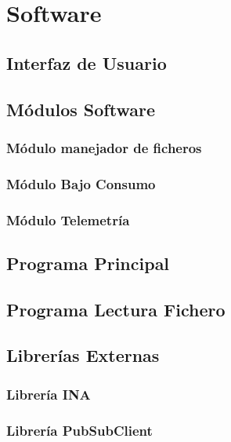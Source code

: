 \section{Software}

\subsection{Interfaz de Usuario}


\subsection{Módulos Software}
\subsubsection{Módulo manejador de ficheros}\label{subsubsec:ManejadorFicheros}








\subsubsection{Módulo Bajo Consumo}


\subsubsection{Módulo Telemetría}


\subsection{Programa Principal}


\subsection{Programa Lectura Fichero}


\subsection{Librerías Externas}
\subsubsection{Librería INA}


\subsubsection{Librería PubSubClient}



